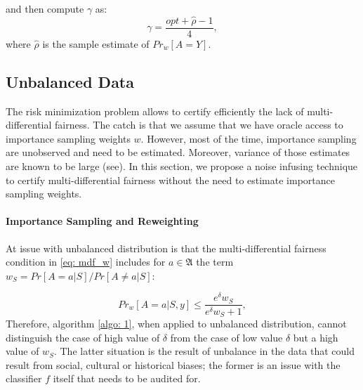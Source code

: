 \documentclass{article}
\begin{document}
and then compute $\gamma$ as:
\begin{equation}
\label{eq: risk2}
\gamma = \frac{opt + \hat{\rho} - 1}{4},
\end{equation}
where $\hat{\rho}$ is the sample estimate of $Pr_{w}[A=Y]$.



\subsection{Unbalanced Data}
The risk minimization problem allows to certify efficiently the lack of multi-differential fairness. The catch is that we assume that we have oracle access to importance sampling weights $w$. However, most of the time, importance sampling are unobserved and need to be estimated. Moreover, variance of those estimates are known to be large (see). In this section, we propose a noise infusing technique to certify multi-differential fairness without the need to estimate importance sampling weights.

\paragraph{Importance Sampling and Reweighting}
At issue with unbalanced distribution is that the multi-differential fairness condition in \eqref{eq: mdf_w} includes for $a\in\mathfrak{A}$ the term $w_{S}= Pr[A=a|S]/Pr[A\neq a|S]$:

\begin{equation}
    \label{eq: mdf_nw}
    Pr_{w}[A=a |S, y] \leq \frac{e^{\delta}w_{S}}{e^{\delta} w_{S} + 1},
\end{equation}
Therefore, algorithm \ref{algo: 1}, when applied to unbalanced distribution, cannot distinguish the case of high value of $\delta$ from the case of low value $\delta$ but a high value of $w_{S}$. The latter situation is the result of unbalance in the data that could result from social, cultural or historical biases; the former is an issue with the classifier $f$ itself that needs to be audited for. 
\end{document}
